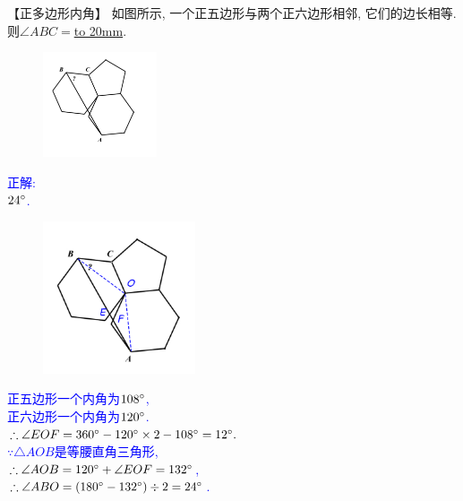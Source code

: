 \item {
    【正多边形内角】
    如图所示, 一个正五边形与两个正六边形相邻, 它们的边长相等. 则$\angle ABC = $\underline{\hbox to 20mm{}}.
    \begin{figure}[H] 
        \centering
        \includegraphics[width=0.3\textwidth]{./pics/Chapter_2/7.png}
    \end{figure}
    \ifshowSolution 
        \fangsong{}\textcolor{blue}{
            正解: \\
            $24\degree$.
            \begin{figure}[H] 
                \centering
                \includegraphics[width=0.4\textwidth]{./pics/Chapter_2/seikai_7.png}
            \end{figure}
            正五边形一个内角为$108\degree$, \\
            正六边形一个内角为$120\degree$. \\
            $\therefore \angle EOF = 360\degree - 120\degree \times 2 - 108\degree = 12\degree.$ \\
            $\because \triangle AOB 是等腰直角三角形$, \\
            $\therefore \angle AOB = 120\degree + \angle EOF = 132\degree$,\\
            $\therefore \angle ABO = (180\degree - 132\degree) \div 2 = 24\degree$.\\
        }
    \else
        \vspace{1cm}
    \fi
}

